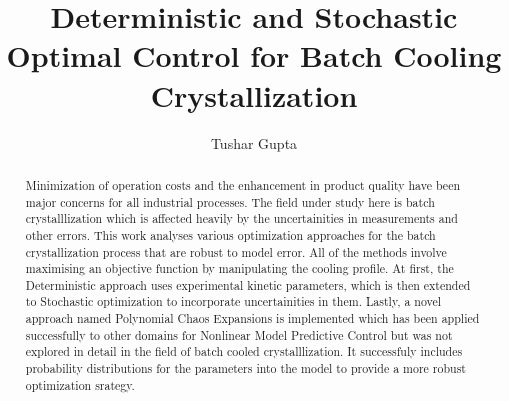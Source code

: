 \documentclass[3p,times]{elsarticle}
\begin{document}
\begin{frontmatter}



\dochead{}

\title{Deterministic and Stochastic Optimal Control for Batch Cooling Crystallization}


\author{Tushar Gupta}

\address{}

\begin{abstract}
Minimization of operation costs and the enhancement in product quality have been
major concerns for all industrial processes. The field under study here is batch crystalllization which is affected heavily by the uncertainities in measurements and other
errors.
This work analyses various optimization approaches for the batch crystallization process that are robust to model error. All of the methods involve maximising an objective function by manipulating the cooling profile. At first, the Deterministic approach uses experimental kinetic parameters, which is then extended to Stochastic optimization to incorporate uncertainities in them. Lastly, a novel approach named Polynomial Chaos Expansions is implemented which has been applied successfully to other domains for
Nonlinear Model Predictive Control but was not explored in detail in the field of batch
cooled crystalllization. It successfuly includes probability distributions for the parameters into the model to provide a more robust optimization srategy.


\end{abstract}
\end{frontmatter}
\end{document}
